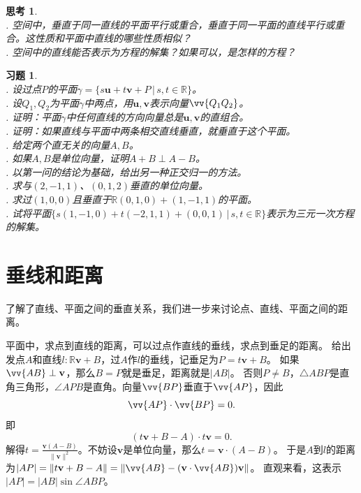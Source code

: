 \documentclass[12pt,UTF8]{ctexbook}
\newtheorem{sk}{思考}[section]
\newtheorem{xt}{习题}[section]
\begin{document}
\begin{sk}
    \mbox{} \\
    . 空间中，垂直于同一直线的平面平行或重合，垂直于同一平面的直线平行或重合。这性质和平面中直线的哪些性质相似？\\
    . 空间中的直线能否表示为方程的解集？如果可以，是怎样的方程？
\end{sk}

\begin{xt}
    \mbox{} \\ 
    . 设过点$P$的平面$\gamma = \{s\mathbf{u} + t\mathbf{v} + P \, | \, s,t\in\mathbb{R}\}$。\\
    . 设$Q_1,Q_2$为平面$\gamma$中两点，用$\mathbf{u},\mathbf{v}$表示向量$\vv{Q_1Q_2}$。\\
    . 证明：平面$\gamma$中任何直线的方向向量总是$\mathbf{u},\mathbf{v}$的直组合。\\
    . 证明：如果直线与平面中两条相交直线垂直，就垂直于这个平面。\\     
    . 给定两个直无关的向量$A,B$。\\
    . 如果$A,B$是单位向量，证明$A+B \perp A-B$。\\
    . 以第一问的结论为基础，给出另一种正交归一的方法。\\
    . 求与$(2,-1,1)$、$(0,1,2)$垂直的单位向量。\\
    . 求过$(1,0,0)$且垂直于$\mathbb{R}(0,1,0)+(1,-1,1)$的平面。\\
    . 试将平面$\{s(1,-1,0) + t(-2,1,1) + (0,0,1) \, | \, s,t\in\mathbb{R}\}$表示为三元一次方程的解集。
\end{xt}


\section{垂线和距离}
了解了直线、平面之间的垂直关系，我们进一步来讨论点、直线、平面之间的距离。

平面中，求点到直线的距离，可以过点作直线的垂线，求点到垂足的距离。
给出发点$A$和直线$l : \mathbb{R}\mathbf{v} + B$，过$A$作$l$的垂线，记垂足为$P = t\mathbf{v} + B$。
如果$\vv{AB}\perp\mathbf{v}$，那么$B=P$就是垂足，距离就是$|AB|$。
否则$P\neq B$，$\triangle ABP$是直角三角形，$\angle APB$是直角。向量$\vv{BP}$垂直于$\vv{AP}$，因此
$$ \vv{AP}\cdot \vv{BP} = 0.$$
即
$$ (t\mathbf{v} + B - A)\cdot t\mathbf{v} = 0.$$
解得$t = \frac{\mathbf{v}(A-B)}{\|\mathbf{v}\|^2}$。不妨设$\mathbf{v}$是单位向量，那么$t=\mathbf{v}\cdot(A-B)$。
于是$A$到$l$的距离为$|AP| = \| t\mathbf{v} + B - A\| = \| \vv{AB} - (\mathbf{v}\cdot \vv{AB})\mathbf{v}\|$。
直观来看，这表示$|AP| = |AB|\sin{\angle ABP}$。
\end{document}
